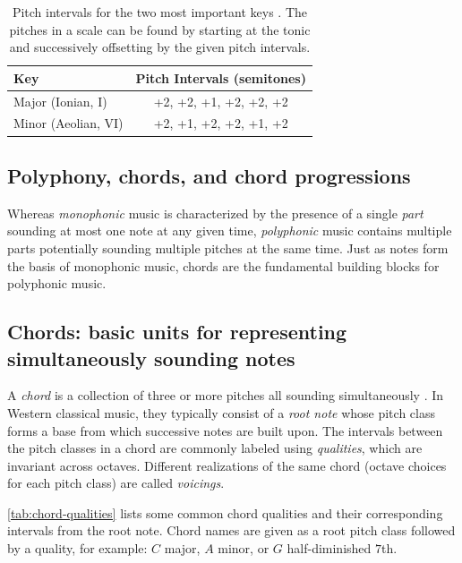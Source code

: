 \begin{table}[tb]
    \centering
    \caption{Pitch intervals for the two most important keys \citep{freedman2015correlational}. The pitches in a scale can be found by starting at the tonic and successively offsetting by the given pitch intervals.}
    \label{tab:key-intervals}
    \begin{tabular}{lc}
        \toprule
        Key & Pitch Intervals (semitones) \\
        \midrule
        Major (Ionian, I) & +2, +2, +1, +2, +2, +2 \\
        Minor (Aeolian, VI) & +2, +1, +2, +2, +1, +2 \\
        \bottomrule
    \end{tabular}
\end{table}

\subsection{Polyphony, chords, and chord progressions}

Whereas \emph{monophonic} music is characterized by the presence of a single
\emph{part} sounding at most one note at any given time, \emph{polyphonic}
music contains multiple parts potentially sounding multiple pitches at the same
time. Just as notes form the basis of monophonic music, chords are the fundamental
building blocks for polyphonic music.

\subsection{Chords: basic units for representing simultaneously sounding notes}

A \emph{chord} is a collection of three or more pitches all sounding
simultaneously \citep{randel1999harvard}. In Western classical music, they
typically consist of a \emph{root note} whose pitch class forms a base from
which successive notes are built upon. The intervals between the pitch classes
in a chord are commonly labeled using \emph{qualities}, which are invariant
across octaves. Different realizations of the same chord (\eg octave choices
for each pitch class) are called \emph{voicings}.

\cref{tab:chord-qualities} lists some common chord qualities and their
corresponding intervals from the root note. Chord names are given as a root
pitch class followed by a quality, for example: $C$ major, $A$ minor, or $G$
half-diminished $7$th.

